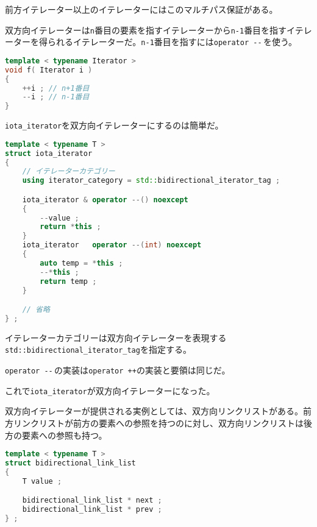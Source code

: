 前方イテレーター以上のイテレーターにはこのマルチパス保証がある。


双方向イテレーターは\texttt{n}番目の要素を指すイテレーターから\texttt{n-1}番目を指すイテレーターを得られるイテレーターだ。\texttt{n-1}番目を指すには\texttt{operator {-}{-}}\,を使う。

\begin{lstlisting}[language={C++}]
template < typename Iterator >
void f( Iterator i )
{
    ++i ; // n+1番目
    --i ; // n-1番目
}
\end{lstlisting}

\texttt{iota\_iterator}を双方向イテレーターにするのは簡単だ。

\begin{lstlisting}[language={C++}]
template < typename T >
struct iota_iterator
{
    // イテレーターカテゴリー
    using iterator_category = std::bidirectional_iterator_tag ;

    iota_iterator & operator --() noexcept
    {
        --value ;
        return *this ;
    }
    iota_iterator   operator --(int) noexcept
    {
        auto temp = *this ;
        --*this ;
        return temp ;
    }

    // 省略
} ;
\end{lstlisting}

イテレーターカテゴリーは双方向イテレーターを表現する\texttt{std::bidirectional\_iterator\_tag}を指定する。

\texttt{operator {-}{-}}\,の実装は\texttt{operator ++}の実装と要領は同じだ。

これで\texttt{iota\_iterator}が双方向イテレーターになった。

双方向イテレーターが提供される実例としては、双方向リンクリストがある。前方リンクリストが前方の要素への参照を持つのに対し、双方向リンクリストは後方の要素への参照も持つ。

\ifTombow\pagebreak\fi
\begin{lstlisting}[language={C++}]
template < typename T >
struct bidirectional_link_list
{
    T value ;

    bidirectional_link_list * next ;
    bidirectional_link_list * prev ;
} ;
\end{lstlisting}


